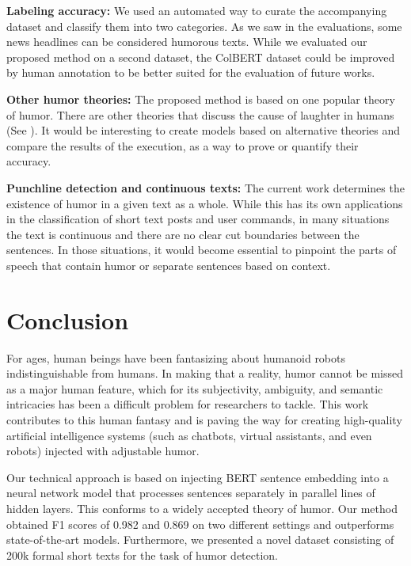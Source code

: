 \documentclass{article}
\begin{document}
\textbf{Labeling accuracy:} We used an automated way to curate the accompanying dataset and classify them into two categories. As we saw in the evaluations, some news headlines can be considered humorous texts. While we evaluated our proposed method on a second dataset, the ColBERT dataset could be improved by human annotation to be better suited for the evaluation of future works.

\textbf{Other humor theories:} The proposed method is based on one popular theory of humor. There are other theories that discuss the cause of laughter in humans (See \cite{attardo2010linguistic, scheel2017definitions}). It would be interesting to create models based on alternative theories and compare the results of the execution, as a way to prove or quantify their accuracy. 

\textbf{Punchline detection and continuous texts:} The current work determines the existence of humor in a given text as a whole. While this has its own applications in the classification of short text posts and user commands, in many situations the text is continuous and there are no clear cut boundaries between the sentences. In those situations, it would become essential to pinpoint the parts of speech that contain humor or separate sentences based on context.

\section{Conclusion}
\label{sec:conclustion}

For ages, human beings have been fantasizing about humanoid robots indistinguishable from humans. In making that a reality, humor cannot be missed as a major human feature, which for its subjectivity, ambiguity, and semantic intricacies has been a difficult problem for researchers to tackle. This work contributes to this human fantasy and is paving the way for creating high-quality artificial intelligence systems (such as chatbots, virtual assistants, and even robots) injected with adjustable humor.

Our technical approach is based on injecting BERT sentence embedding into a neural network model that processes sentences separately in parallel lines of hidden layers. This conforms to a widely accepted theory of humor. Our method obtained F1 scores of 0.982 and 0.869 on two different settings and outperforms state-of-the-art models. Furthermore, we presented a novel dataset consisting of 200k formal short texts for the task of humor detection.
\end{document}
